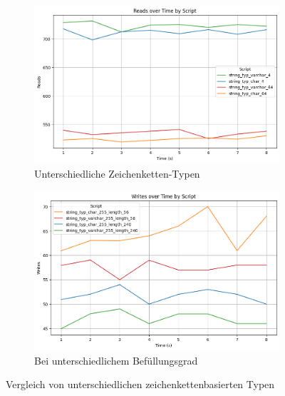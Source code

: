 \vspace{-8pt}
\begin{figure}[H]
    \centering
    \begin{subfigure}[t]{0.48\textwidth}
        \centering
        \includegraphics[width=\textwidth]{PNGs/Script/Data_Types/Smaller/string-type/Reads}
        \caption{Unterschiedliche Zeichenketten-Typen}
        \label{fig:data-types-smaller-string-type-reads}
    \end{subfigure}
    \hfill
    \begin{subfigure}[t]{0.48\textwidth}
        \centering
        \includegraphics[width=\textwidth]{PNGs/Script/Data_Types/Smaller/string-type-length/Writes}
        \caption{Bei unterschiedlichem Befüllungsgrad}
        \label{fig:data-types-smaller-string-type-length-writes}
    \end{subfigure}
    \vspace{-6pt}
    \caption[Datentypen: Zeichenkettenbasierte Typen]{Vergleich von unterschiedlichen zeichenkettenbasierten Typen}
\end{figure}